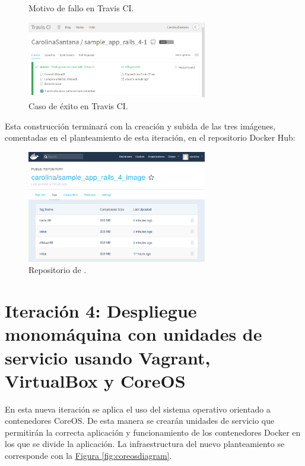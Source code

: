 \begin{figure}[H]
\centering
{}
\caption{Motivo de fallo en Travis CI.}
\end{figure}

\begin{figure}[H]
\centering
\includegraphics[width=0.7\textwidth]{images/figures/travissuccess2.png}
\caption{Caso de éxito en Travis CI.}
\end{figure}

Esta construcción terminará con la creación y subida de las tres imágenes, comentadas en el planteamiento de esta iteración, en el repositorio Docker Hub:

\begin{figure}[H]
\centering
\includegraphics[width=0.7\textwidth]{images/figures/dockerhubimages.png}
\caption{Repositorio de .\label{fig:dockerhub_images}}
\end{figure}

\section[Iteración 4: Despliegue en VirtualBox]{Iteración 4: Despliegue monomáquina con unidades de servicio usando Vagrant, VirtualBox y CoreOS}

En esta nueva iteración se aplica el uso del sistema operativo orientado a contenedores CoreOS. De esta manera se crearán unidades de servicio  que permitirán la correcta aplicación y funcionamiento de los contenedores Docker en los que se divide la aplicación. La infraestructura del nuevo planteamiento se corresponde con la \hyperref[fig:coreosdiagram]{Figura \ref{fig:coreosdiagram}}.

